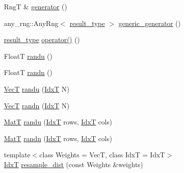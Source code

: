 \begin{DoxyCompactItemize}
\item 
Rng\-T \& \hyperlink{classparallel__rng_1_1ParallelRngManager_a969cdf585fbcf56bbc819c6fc83c58c6}{generator} ()
\item 
any\-\_\-rng\-::\-Any\-Rng$<$ \hyperlink{classparallel__rng_1_1ParallelRngManager_a199ad0d83c322a1f4415280002dcb386}{result\-\_\-type} $>$ \hyperlink{classparallel__rng_1_1ParallelRngManager_a7868b3d416636d9a6054dee7ea9cb5a6}{generic\-\_\-generator} ()
\item 
\hyperlink{classparallel__rng_1_1ParallelRngManager_a199ad0d83c322a1f4415280002dcb386}{result\-\_\-type} \hyperlink{classparallel__rng_1_1ParallelRngManager_a47112a035567940db2fd55669661d3fd}{operator()} ()
\item 
Float\-T \hyperlink{classparallel__rng_1_1ParallelRngManager_ae739518cd6d23a283e38f8e3d1e1608b}{randu} ()
\item 
Float\-T \hyperlink{classparallel__rng_1_1ParallelRngManager_a5de4e9e9d6e29912c7433b5c3b447ec9}{randn} ()
\item 
\hyperlink{classparallel__rng_1_1ParallelRngManager_a85a7225592fc063e7c0bb6d1c947f177}{Vec\-T} \hyperlink{classparallel__rng_1_1ParallelRngManager_ab38cd0beff70131e8e2f8863489c1f63}{randu} (\hyperlink{namespaceparallel__rng_aa22fa3e339aee5927780aac099dfc6f3}{Idx\-T} N)
\item 
\hyperlink{classparallel__rng_1_1ParallelRngManager_a85a7225592fc063e7c0bb6d1c947f177}{Vec\-T} \hyperlink{classparallel__rng_1_1ParallelRngManager_a84c2c76aef6083e80cd2ab6668d6e7d6}{randn} (\hyperlink{namespaceparallel__rng_aa22fa3e339aee5927780aac099dfc6f3}{Idx\-T} N)
\item 
\hyperlink{classparallel__rng_1_1ParallelRngManager_af73ca29a72b66f92794f435a6163770d}{Mat\-T} \hyperlink{classparallel__rng_1_1ParallelRngManager_a877c1742bbe45a4e53ad0c6ba69a96b5}{randu} (\hyperlink{namespaceparallel__rng_aa22fa3e339aee5927780aac099dfc6f3}{Idx\-T} rows, \hyperlink{namespaceparallel__rng_aa22fa3e339aee5927780aac099dfc6f3}{Idx\-T} cols)
\item 
\hyperlink{classparallel__rng_1_1ParallelRngManager_af73ca29a72b66f92794f435a6163770d}{Mat\-T} \hyperlink{classparallel__rng_1_1ParallelRngManager_a38ad5e7224e35275d94d84c66c62cb60}{randn} (\hyperlink{namespaceparallel__rng_aa22fa3e339aee5927780aac099dfc6f3}{Idx\-T} rows, \hyperlink{namespaceparallel__rng_aa22fa3e339aee5927780aac099dfc6f3}{Idx\-T} cols)
\item 
{\footnotesize template$<$class Weights  = Vec\-T, class Idx\-T  = Idx\-T$>$ }\\\hyperlink{namespaceparallel__rng_aa22fa3e339aee5927780aac099dfc6f3}{Idx\-T} \hyperlink{classparallel__rng_1_1ParallelRngManager_add4bd5a95d4923135406e4b9eb72737d}{resample\-\_\-dist} (const Weights \&weights)

\end{DoxyCompactItemize}
